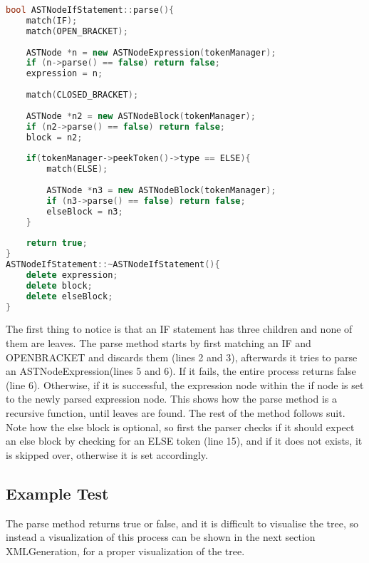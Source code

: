 \begin{lstlisting}[language=C++]
bool ASTNodeIfStatement::parse(){
	match(IF);
	match(OPEN_BRACKET);
	
	ASTNode *n = new ASTNodeExpression(tokenManager);
	if (n->parse() == false) return false;
	expression = n;
	
	match(CLOSED_BRACKET);
	
	ASTNode *n2 = new ASTNodeBlock(tokenManager);
	if (n2->parse() == false) return false;
	block = n2;
	
	if(tokenManager->peekToken()->type == ELSE){
		match(ELSE);
		
		ASTNode *n3 = new ASTNodeBlock(tokenManager);
		if (n3->parse() == false) return false;
		elseBlock = n3;
	}
	
	return true;
}
ASTNodeIfStatement::~ASTNodeIfStatement(){
	delete expression;
	delete block;
	delete elseBlock;
}
\end{lstlisting}

The first thing to notice is that an IF statement has three children and none of them are leaves. The parse method starts by first matching an IF and OPEN\un BRACKET and discards them (lines 2 and 3), afterwards it tries to parse an ASTNodeExpression(lines 5 and 6). If it fails, the entire process returns false (line 6). Otherwise, if it is successful, the expression node within the if node is set to the newly parsed expression node. This shows how the parse method is a recursive function, until leaves are found. The rest of the method follows suit. Note how the else block is optional, so first the parser checks if it should expect an else block by checking for an ELSE token (line 15), and if it does not exists, it is skipped over, otherwise it is set accordingly.


\subsection{Example Test}
The parse method returns true or false, and it is difficult to visualise the tree, so instead a visualization of this process can be shown in the next section XMLGeneration, for a proper visualization of the tree.